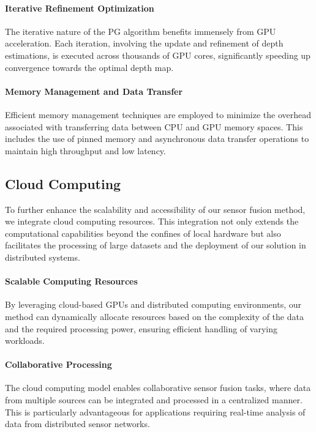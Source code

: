 \documentclass[conference]{IEEEtran}
\begin{document}
\paragraph{Iterative Refinement Optimization} The iterative nature of the PG algorithm benefits immensely from GPU acceleration. Each iteration, involving the update and refinement of depth estimations, is executed across thousands of GPU cores, significantly speeding up convergence towards the optimal depth map.

\paragraph{Memory Management and Data Transfer} Efficient memory management techniques are employed to minimize the overhead associated with transferring data between CPU and GPU memory spaces. This includes the use of pinned memory and asynchronous data transfer operations to maintain high throughput and low latency.

\subsection{Cloud Computing}

To further enhance the scalability and accessibility of our sensor fusion method, we integrate cloud computing resources. This integration not only extends the computational capabilities beyond the confines of local hardware but also facilitates the processing of large datasets and the deployment of our solution in distributed systems.

\paragraph{Scalable Computing Resources} By leveraging cloud-based GPUs and distributed computing environments, our method can dynamically allocate resources based on the complexity of the data and the required processing power, ensuring efficient handling of varying workloads.

\paragraph{Collaborative Processing} The cloud computing model enables collaborative sensor fusion tasks, where data from multiple sources can be integrated and processed in a centralized manner. This is particularly advantageous for applications requiring real-time analysis of data from distributed sensor networks.
\end{document}

